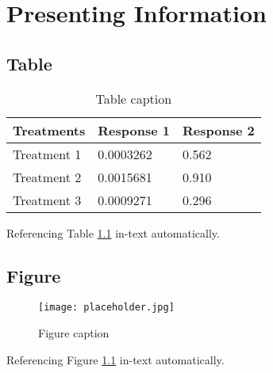 \documentclass[11pt,fleqn]{book} %
\begin{document}


\chapter{Presenting Information}

\section{Table}

\begin{table}[h]
\centering
\begin{tabular}{l l l}
\toprule
\textbf{Treatments} & \textbf{Response 1} & \textbf{Response 2}\\
\midrule
Treatment 1 & 0.0003262 & 0.562 \\
Treatment 2 & 0.0015681 & 0.910 \\
Treatment 3 & 0.0009271 & 0.296 \\
\bottomrule
\end{tabular}
\caption{Table caption}
\label{tab:example} %
\end{table}

Referencing Table \ref{tab:example} in-text automatically.


\section{Figure}

\begin{figure}[h]
\centering\texttt{[image: placeholder.jpg]}
\caption{Figure caption}
\label{fig:placeholder} %
\end{figure}

Referencing Figure \ref{fig:placeholder} in-text automatically.

\end{document}
